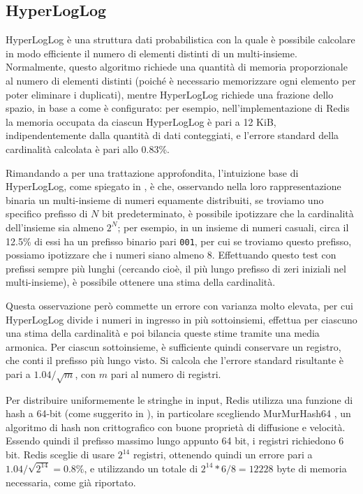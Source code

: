 \subsection{HyperLogLog}

HyperLogLog \cite{hyperloglog} è una struttura dati probabilistica con la quale è possibile
calcolare in modo efficiente il numero di elementi distinti di un multi-insieme. Normalmente, questo
algoritmo richiede una quantità di memoria proporzionale al numero di elementi distinti (poiché è
necessario memorizzare ogni elemento per poter eliminare i duplicati), mentre HyperLogLog richiede
una frazione dello spazio, in base a come è configurato: per esempio, nell'implementazione di Redis
la memoria occupata da ciascun HyperLogLog è pari a 12 KiB, indipendentemente dalla quantità di dati
conteggiati, e l'errore standard della cardinalità calcolata è pari allo 0.83\%.

Rimandando a \cite{hyperloglog} per una trattazione approfondita, l'intuizione base di HyperLogLog,
come spiegato in \cite{hyperloglog-explain}, è che, osservando nella loro
rappresentazione binaria un multi-insieme di numeri equamente distribuiti, se troviamo uno specifico
prefisso di $N$ bit predeterminato, è possibile ipotizzare che la cardinalità dell'insieme sia
almeno $2^N$; per esempio, in un insieme di numeri casuali, circa il 12.5\% di essi ha un prefisso
binario pari \verb|001|, per cui se troviamo questo prefisso, possiamo ipotizzare che i numeri siano
almeno 8. Effettuando questo test con prefissi sempre più lunghi (cercando cioè, il più lungo
prefisso di zeri iniziali nel multi-insieme), è possibile ottenere una stima della cardinalità.

Questa osservazione però commette un errore con varianza molto elevata, per cui HyperLogLog divide i
numeri in ingresso in più sottoinsiemi, effettua per ciascuno una stima della cardinalità e poi
bilancia queste stime tramite una media armonica. Per ciascun sottoinsieme, è sufficiente quindi
conservare un registro, che conti il prefisso più lungo visto. Si calcola che l'errore standard 
risultante è pari a $1.04 / \sqrt{m}$, con $m$ pari al numero di registri. 

Per distribuire uniformemente le stringhe in input, Redis utilizza una funzione di hash a 64-bit
(come suggerito in \cite{hyperloglog-plusplus}), in particolare scegliendo MurMurHash64
\cite{murmur}, un algoritmo di hash non crittografico con buone proprietà di diffusione e velocità.
Essendo quindi il prefisso massimo lungo appunto 64 bit, i registri richiedono 6 bit. Redis sceglie
di usare $2^{14}$ registri, ottenendo quindi un errore pari a $1.04 / \sqrt{2^{14}} = 0.8\%$, e
utilizzando un totale di $2^{14} * 6 / 8 = 12228$ byte di memoria necessaria, come già riportato.

